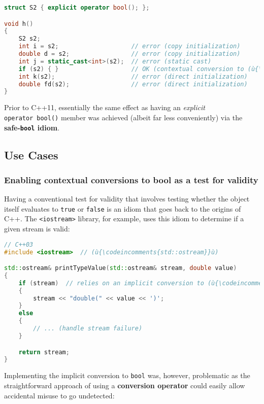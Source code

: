 \begin{lstlisting}[language=C++]
struct S2 { explicit operator bool(); };

void h()
{
    S2 s2;
    int i = s2;                    // error (copy initialization)
    double d = s2;                 // error (copy initialization)
    int j = static_cast<int>(s2);  // error (static cast)
    if (s2) { }                    // OK (contextual conversion to (ù{\codeincomments{bool}}ù))
    int k(s2);                     // error (direct initialization)
    double fd(s2);                 // error (direct initialization)
}
\end{lstlisting}

\noindent Prior to C++11, essentially the same effect as having an \emph{explicit}
\texttt{operator}~\texttt{bool()} member was achieved (albeit far less
conveniently) via the \textbf{safe-\texttt{bool} idiom}.

\subsection[Use Cases]{Use Cases}\label{use-cases-explicitconv}

\subsubsection[Enabling contextual conversions to {\tt bool} as a test for validity]{Enabling contextual conversions to {\SubsubsecCode bool} as a test for validity}\label{enabling-contextual-conversions-to-bool-as-a-test-for-validity}

Having a conventional test for validity that involves testing whether the object itself evaluates to \texttt{true} or \texttt{false} is an idiom that goes back to the
origins of C++. The \texttt{<iostream>} library, for example, uses this
idiom to determine if a given stream is valid:

\begin{lstlisting}[language=C++]
// C++03
#include <iostream>  // (ù{\codeincomments{std::ostream}}ù)

std::ostream& printTypeValue(std::ostream& stream, double value)
{
    if (stream)  // relies on an implicit conversion to (ù{\codeincomments{bool}}ù)
    {
        stream << "double(" << value << ')';
    }
    else
    {
        // ... (handle stream failure)
    }

    return stream;
}
\end{lstlisting}

\noindent Implementing the implicit conversion to \texttt{bool} was, however,
problematic as the straight\-forward approach of using a
\textbf{conversion operator} could easily allow accidental misuse to go
undetected:

